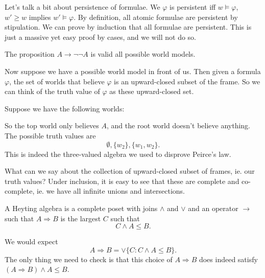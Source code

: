 \documentclass[a4paper]{article}
\begin{document}
Let's talk a bit about persistence of formulae. We $\varphi$ is persistent iff $w \vDash\varphi$, $w' \geq w$ implies $w' \vDash \varphi$. By definition, all atomic formulae are persistent by stipulation. We can prove by induction that all formulae are persistent. This is just a massive yet easy proof by cases, and we will not do so.

\begin{eg}
  The proposition $A \to \neg \neg A$ is valid all possible world models.

\end{eg}


Now suppose we have a possible world model in front of us. Then given a formula $\varphi$, the set of worlds that believe $\varphi$ is an upward-closed subset of the frame. So we can think of the truth value of $\varphi$ as these upward-closed set.
\begin{eg}
  Suppose we have the following worlds:
  \begin{center}
  \end{center}
  So the top world only believes $A$, and the root world doesn't believe anything. The possible truth values are
  \[
    \emptyset, \{w_2\}, \{w_1, w_2\}.
  \]
  This is indeed the three-valued algebra we used to disprove Peirce's law. %
\end{eg}
What can we say about the collection of upward-closed subset of frames, ie. our truth values? Under inclusion, it is easy to see that these are complete and co-complete, ie. we have all infinite unions and intersections.
\begin{defi}
  A Heyting algebra is a complete poset with joins $\wedge$ and $\vee$ and an operator $\to$ such that $A \Rightarrow B$ is the largest $C$ such that
  \[
    C \wedge A \leq B.
  \]
\end{defi}
We would expect
\[
  A \Rightarrow B = \vee \{C : C \wedge A \leq B\}.
\]
The only thing we need to check is that this choice of $A \Rightarrow B$ does indeed satisfy $(A \Rightarrow B) \wedge A \leq B$. %
\end{document}
